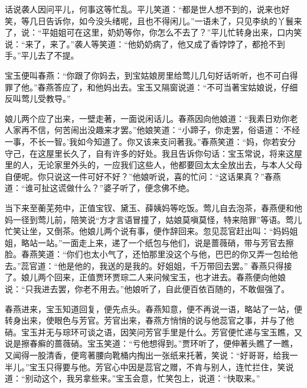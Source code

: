 
\begin{parag}

    话说袭人因问平儿，何事这等忙乱。平儿笑道：“都是世人想不到的，说来也好笑，等几日告诉你，如今没头绪呢，且也不得闲儿。”一语未了，只见李纨的丫鬟来了，说：“平姐姐可在这里，奶奶等你，你怎么不去了？”平儿忙转身出来，口内笑说：“来了，来了。”袭人等笑道：“他奶奶病了，他又成了香饽饽了，都抢不到手。”平儿去了不提。
\end{parag}


\begin{parag}


    宝玉便叫春燕：“你跟了你妈去，到宝姑娘房里给莺儿几句好话听听，也不可白得罪了他。”春燕答应了，和他妈出去。宝玉又隔窗说道：“不可当著宝姑娘说，仔细反叫莺儿受教导。”
\end{parag}


\begin{parag}


    娘儿两个应了出来，一壁走著，一面说闲话儿。春燕因向他娘道：“我素日劝你老人家再不信，何苦闹出没趣来才罢。”他娘笑道：“小蹄子，你走罢，俗语道：‘不经一事，不长一智。’我如今知道了。你又该来支问著我。”春燕笑道：“妈，你若安分守己，在这屋里长久了，自有许多的好处。我且告诉你句话：宝玉常说，将来这屋里的人，无论家里外头的，一应我们这些人，他都要回太太全放出去，与本人父母自便呢。你只说这一件可好不好？”他娘听说，喜的忙问：“这话果真？”春燕道：“谁可扯这谎做什么？”婆子听了，便念佛不绝。
\end{parag}


\begin{parag}


    当下来至蘅芜苑中，正值宝钗、黛玉、薛姨妈等吃饭。莺儿自去泡茶，春燕便和他妈一径到莺儿前，陪笑说“方才言语冒撞了，姑娘莫嗔莫怪，特来陪罪”等语。莺儿忙笑让坐，又倒茶。他娘儿两个说有事，便作辞回来。忽见蕊官赶出叫：“妈妈姐姐，略站一站。”一面走上来，递了一个纸包与他们，说是蔷薇硝，带与芳官去擦脸。春燕笑道：“你们也太小气了，还怕那里没这个与他，巴巴的你又弄一包给他去。”蕊官道：“他是他的，我送的是我的。好姐姐，千万带回去罢。” 春燕只得接了。娘儿两个回来，正值贾环贾琮二人来问候宝玉，也才进去。春燕便向他娘说：“只我进去罢，你老不用去。”他娘听了，自此便百依百随的，不敢倔强了。
\end{parag}


\begin{parag}


    春燕进来，宝玉知道回复，便先点头。春燕知意，便不再说一语，略站了一站，便转身出来，使眼色与芳官。芳官出来，春燕方悄悄的说与他蕊官之事，并与了他硝。宝玉并无与琮环可谈之语，因笑问芳官手里是什么。芳官便忙递与宝玉瞧，又说是擦春癣的蔷薇硝。宝玉笑道：“亏他想得到。”贾环听了，便伸著头瞧了一瞧，又闻得一股清香，便弯著腰向靴桶内掏出一张纸来托著，笑说：“好哥哥，给我一半儿。”宝玉只得要与他。芳官心中因是蕊官之赠，不肯与别人，连忙拦住，笑说道：“别动这个，我另拿些来。”宝玉会意，忙笑包上，说道：“快取来。”
\end{parag}


